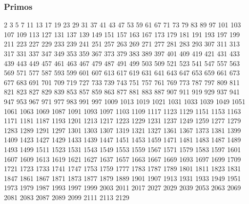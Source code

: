 \documentclass[10pt, landscape, twocolumn, a4paper, notitlepage]{article}
\begin{document}
\subsubsection{Primos}
2 3 5 7 11 13 17 19 23 29
31 37 41 43 47 53 59 61 67 71
73 79 83 89 97 101 103 107 109 113
127 131 137 139 149 151 157 163 167 173
179 181 191 193 197 199 211 223 227 229
233 239 241 251 257 263 269 271 277 281
283 293 307 311 313 317 331 337 347 349
353 359 367 373 379 383 389 397 401 409
419 421 431 433 439 443 449 457 461 463
467 479 487 491 499 503 509 521 523 541
547 557 563 569 571 577 587 593 599 601
607 613 617 619 631 641 643 647 653 659
661 673 677 683 691 701 709 719 727 733
739 743 751 757 761 769 773 787 797 809
811 821 823 827 829 839 853 857 859 863
877 881 883 887 907 911 919 929 937 941
947 953 967 971 977 983 991 997 1009 1013
1019 1021 1031 1033 1039 1049 1051 1061 1063 1069
1087 1091 1093 1097 1103 1109 1117 1123 1129 1151
1153 1163 1171 1181 1187 1193 1201 1213 1217 1223
1229 1231 1237 1249 1259 1277 1279 1283 1289 1291
1297 1301 1303 1307 1319 1321 1327 1361 1367 1373
1381 1399 1409 1423 1427 1429 1433 1439 1447 1451
1453 1459 1471 1481 1483 1487 1489 1493 1499 1511
1523 1531 1543 1549 1553 1559 1567 1571 1579 1583
1597 1601 1607 1609 1613 1619 1621 1627 1637 1657
1663 1667 1669 1693 1697 1699 1709 1721 1723 1733
1741 1747 1753 1759 1777 1783 1787 1789 1801 1811
1823 1831 1847 1861 1867 1871 1873 1877 1879 1889
1901 1907 1913 1931 1933 1949 1951 1973 1979 1987
1993 1997 1999 2003 2011 2017 2027 2029 2039 2053
2063 2069 2081 2083 2087 2089 2099 2111 2113 2129
\end{document}
